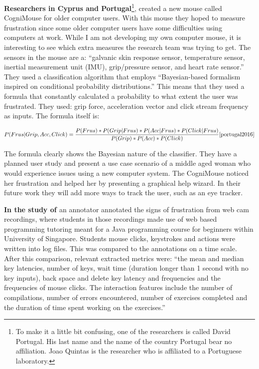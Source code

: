 \textbf{Researchers in Cyprus and Portugal}\footnote{To make it a little bit confusing, one of the researchers is called David Portugal. His last name and the name of the country Portugal bear no affiliation. Jo\˜ao Quintas is the researcher who is affiliated to a Portuguese laboratory.}, created a new mouse called CogniMouse\cite{portugal2016} for older computer users. With this mouse they hoped to measure frustration since some older computer users have some difficulties using computers at work. While I am not developing my own computer mouse, it is interesting to see which extra measures the research team was trying to get. The sensors in the mouse are a: ``galvanic skin response sensor, temperature sensor, inertial measurement unit (IMU), grip/pressure sensor, and heart rate sensor.'' \cite{portugal2016} They used a classification algorithm that employs ``Bayesian-based formalism inspired on conditional probability distributions.'' \cite{portugal2016} This means that they used a formula that constantly calculated a probability to what extent the user was frustrated. They used: grip force, acceleration vector and click stream frequency as inputs. The formula itself is:

$$P(Frus|Grip,Acc,Click)=\dfrac{P(Frus)*P(Grip|Frus)*P(Acc|Frus)*P(Click|Frus)}{P(Grip)*P(Acc)*P(Click)}\cite{portugal2016}$$

The formula clearly shows the Bayesian nature of the classifier. They have a planned user study and present a use case scenario of a middle aged woman who would experience issues using a new computer system. The CogniMouse noticed her frustration and helped her by presenting a graphical help wizard. In their future work they will add more ways to track the user, such as an eye tracker.

\textbf{In the study of \cite{leong2016}} an annotator annotated the signs of frustration from web cam recordings, where students in those recordings made use of web based programming tutoring meant for a Java programming course for beginners within University of Singapore. Students mouse clicks, keystrokes and actions were written into log files. This was compared to the annotations on a time scale. After this comparison, relevant extracted metrics were: ``the mean and median key latencies, number of keys, wait time (duration longer than 1 second with no key inputs), back space and delete key latency and frequencies and the frequencies of mouse clicks. The interaction features include the number of compilations, number of errors encountered, number of exercises completed and the duration of time spent working on the exercises.'' \cite{leong2016}

